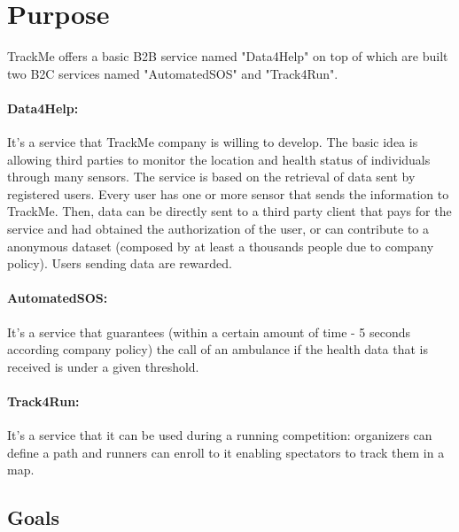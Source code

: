\documentclass[../../rasd.tex]{subfiles}
\begin{document}
\section{Purpose}
			TrackMe offers a basic B2B service named "Data4Help" on top of which are built two B2C services named "AutomatedSOS" and "Track4Run".
			\paragraph{Data4Help:}It's a service that TrackMe company is willing to develop. The basic idea is allowing third parties to monitor the location and health status of individuals through many sensors. The service is based on the retrieval of data sent by registered users. Every user has one or more sensor that sends the information to TrackMe. Then, data can be directly sent to a third party client that pays for the service and had obtained the authorization of the user, or can contribute to a anonymous dataset (composed by at least a thousands people due to company policy). Users sending data are rewarded.\\
			
			\paragraph{AutomatedSOS:}It's a service that guarantees (within a certain amount of time - 5 seconds according company policy) the call of an ambulance if the health data that is received is under a given threshold.
			
			\paragraph{Track4Run:}It's a service that it can be used during a running competition: organizers can define a path and runners can enroll to it enabling spectators to track them in a map.
			\subsection{Goals}
\end{document}

